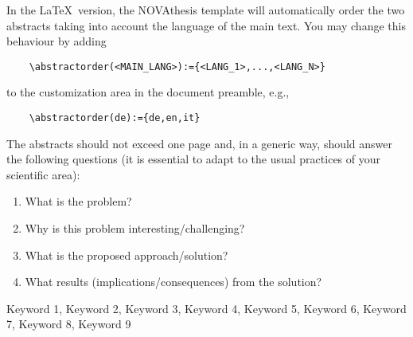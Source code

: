 In the \LaTeX\ version, the NOVAthesis template will automatically order the two abstracts taking into account the language of the main text. You may change this behaviour by adding
\begin{verbatim}
    \abstractorder(<MAIN_LANG>):={<LANG_1>,...,<LANG_N>}
\end{verbatim}
\noindent to the customization area in the document preamble, e.g.,
\begin{verbatim}
    \abstractorder(de):={de,en,it}
\end{verbatim}

The abstracts should not exceed one page and, in a generic way, should answer the following questions (it is essential to adapt to the usual practices of your scientific area):

\begin{enumerate}
  \item What is the problem?
  \item Why is this problem interesting/challenging?
  \item What is the proposed approach/solution?
  \item What results (implications/consequences) from the solution?
\end{enumerate}

\begin{keywords}
Keyword 1, Keyword 2, Keyword 3, Keyword 4, Keyword 5, Keyword 6, Keyword 7, Keyword 8, Keyword 9
\end{keywords} 

